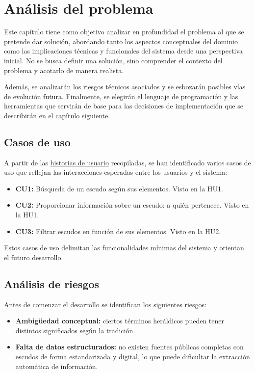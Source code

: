 \chapter{Análisis del problema}
Este capítulo tiene como objetivo analizar en profundidad el problema al que se pretende 
dar solución, abordando tanto los aspectos conceptuales del dominio como las implicaciones 
técnicas y funcionales del sistema desde una perspectiva inicial. No se busca definir una
solución, sino comprender el contexto del problema y acotarlo de manera realista.

Además, se analizarán los riesgos técnicos asociados y se esbozarán posibles vías de 
evolución futura. Finalmente, se elegirán el lenguaje de programación y las herramientas
que servirán de base para las decisiones de implementación que se describirán en el capítulo 
siguiente.

\section{Casos de uso}
A partir de las \hyperref[sec:historias_usuario]{historias de usuario} recopiladas, se han 
identificado varios casos de uso que reflejan las interacciones esperadas entre los usuarios
y el sistema:
\begin{itemize}
    \item \textbf{CU1: } Búsqueda de un escudo según sus elementos. Visto en la HU1.
    \item \textbf{CU2: } Proporcionar información sobre un escudo: a quién pertenece. Visto en la HU1.
    \item \textbf{CU3: } Filtrar escudos en función de sus elementos. Visto en la HU2.
\end{itemize}

Estos casos de uso delimitan las funcionalidades mínimas del sistema y orientan el futuro desarrollo.

\section{Análisis de riesgos}
Antes de comenzar el desarrollo se identifican los siguientes riesgos:

\begin{itemize}
    \item \textbf{Ambigüedad conceptual: } ciertos términos heráldicos pueden tener distintos
    significados según la tradición.
    \item \textbf{Falta de datos estructurados: } no existen fuentes públicas completas con escudos
    de forma estandarizada y digital, lo que puede dificultar la extracción automática de información.
\end{itemize}

